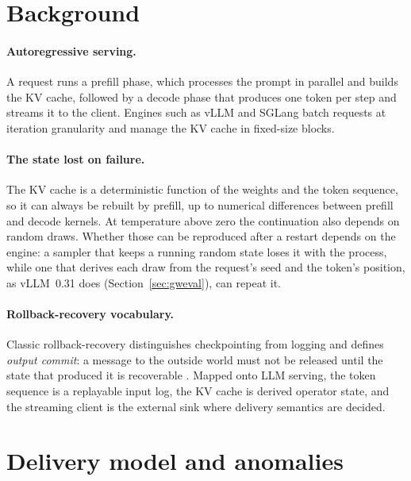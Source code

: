 \documentclass[10pt,twocolumn]{article}
\begin{document}
\section{Background}

\paragraph{Autoregressive serving.}
A request runs a prefill phase, which processes the prompt in parallel and
builds the KV cache, followed by a decode phase that produces one token per
step and streams it to the client. Engines such as vLLM \cite{kwon2023pagedattention}
and SGLang \cite{zheng2024sglang} batch requests at iteration granularity
\cite{yu2022orca} and manage the KV cache in fixed-size blocks.

\paragraph{The state lost on failure.}
The KV cache is a deterministic function of the weights and the token
sequence, so it can always be rebuilt by prefill, up to numerical
differences between prefill and decode kernels. At temperature above zero
the continuation also depends on random draws. Whether those can be
reproduced after a restart depends on the engine: a sampler that keeps a
running random state loses it with the process, while one that derives each
draw from the request's seed and the token's position, as vLLM~0.31 does
(Section~\ref{sec:gweval}), can repeat it.

\paragraph{Rollback-recovery vocabulary.}
Classic rollback-recovery distinguishes checkpointing from logging and defines
\emph{output commit}: a message to the outside world must not be released
until the state that produced it is recoverable \cite{elnozahy2002survey}.
Mapped onto LLM serving, the token sequence is a replayable input log, the KV
cache is derived operator state, and the streaming client is the external
sink where delivery semantics are decided.

\section{Delivery model and anomalies}
\label{sec:model}
\end{document}
